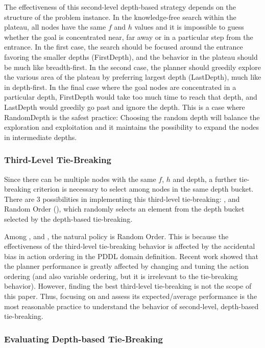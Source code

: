 The effectiveness of this second-level depth-based strategy depends on the
structure of the problem instance.  In the knowledge-free search within
the plateau, all nodes have the same $f$ and $h$ values
and it is impossible to guess whether the goal is concentrated near, far
away or in a particular step from the entrance.  In the first case, the
search should be focused around the entrance favoring the smaller depths
(FirstDepth), and the behavior in the plateau should be much like breadth-first. In the
second case, the planner should greedily explore the various area of the
plateau by preferring largest depth (LastDepth), much like in
depth-first. In the final case where the goal nodes are concentrated in
a particular depth, FirstDepth would take too much time to reach that
depth, and LastDepth would greedily go past and ignore the depth.
This is a case
where RandomDepth is the safest practice: 
Choosing the random depth will balance the exploration and exploitation
and it maintains the possibility to expand the nodes in intermediate depths.

\subsubsection{Third-Level Tie-Breaking}

Since there can be multiple nodes with the same $f$, $h$ and depth,
a further tie-breaking criterion is necessary to select among nodes in the same depth bucket.
There are 3 possibilities in implementing this third-level tie-breaking:
\fifo, \lifo and Random Order (\ro), which
randomly selects an element from the depth bucket selected by the depth-based tie-breaking.

Among \fifo, \lifo and \ro, the natural policy is Random Order.
This is because the effectiveness of the third-level tie-breaking behavior
is affected by the accidental bias in action ordering in the PDDL domain
definition.  Recent work \cite{vallati2015effective} showed that the
planner performance is greatly affected by changing and tuning the action ordering
(and also variable ordering, but it is irrelevant to the tie-breaking behavior). 
However, finding the best third-level tie-breaking is not the scope of this paper.
Thus, focusing on \ro and assess its expected/average
performance is the most reasonable practice to understand the behavior of second-level,
depth-based tie-breaking.


\subsubsection{Evaluating Depth-based Tie-Breaking}

